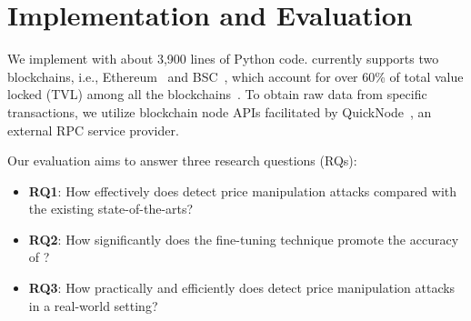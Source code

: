 \section{Implementation and Evaluation}
\label{sec:evaluation}

We implement \tool with about 3,900 lines of Python code.
\tool currently supports two blockchains, i.e., Ethereum~\cite{ethereum} and BSC~\cite{bsc}, which account for over 60\% of total value locked (TVL) among all the blockchains~\cite{defillama_chains}.
To obtain raw data from specific transactions, we utilize blockchain node APIs facilitated by QuickNode~\cite{quicknode}, an external RPC service provider.

Our evaluation aims to answer three research questions (RQs):
\begin{itemize}[leftmargin=*,noitemsep,topsep=0pt]
    \item \textbf{RQ1}: How effectively does \tool detect price manipulation attacks compared with the existing state-of-the-arts?
    \item \textbf{RQ2}: How significantly does the fine-tuning technique promote the accuracy of \tool?
    \item \textbf{RQ3}: How practically and efficiently does \tool detect price manipulation attacks in a real-world setting? %
\end{itemize}



